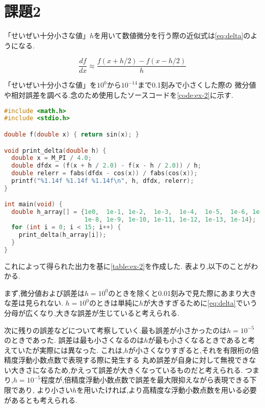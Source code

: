\documentclass[autodetect-engine, dvi=dvipdfmx, 10pt, a4paper, ja=standard]{bxjsarticle}
\begin{document}
\newpage

\section{課題2}

「せいぜい十分小さな値」$h$を用いて数値微分を行う際の近似式は\ref{eq:delta}のようになる.

\begin{equation}
	\label{eq:delta}
	\frac{df}{dx} \approx \frac{f(x + h / 2) - f(x - h / 2)}{h}
\end{equation}

「せいぜい十分小さな値」を$10^0$から$10^{-14}$まで0.1刻みで小さくした際の
微分値や相対誤差を調べる.念のため使用したソースコードを\ref{code:ex-2}に示す.

\begin{lstlisting}[language={C}, caption={課題2で使用したソースコード}, label={code:ex-2}]
#include <math.h>
#include <stdio.h>

double f(double x) { return sin(x); }

void print_delta(double h) {
  double x = M_PI / 4.0;
  double dfdx = (f(x + h / 2.0) - f(x - h / 2.0)) / h;
  double relerr = fabs(dfdx - cos(x)) / fabs(cos(x));
  printf("%1.14f %1.14f %1.14f\n", h, dfdx, relerr);
}

int main(void) {
  double h_array[] = {1e0,  1e-1, 1e-2,  1e-3,  1e-4,  1e-5,  1e-6, 1e-7,
                      1e-8, 1e-9, 1e-10, 1e-11, 1e-12, 1e-13, 1e-14};
  for (int i = 0; i < 15; i++) {
    print_delta(h_array[i]);
  }
}

\end{lstlisting}

これによって得られた出力を基に\ref{table:ex-2}を作成した.
表より,以下のことがわかる.

まず,微分値および誤差は$h=10^{0}$のときを除くと0.01刻みで見た際にあまり大きな差は見られない.
$h=10^{0}$のときは単純に$h$が大きすぎるために\ref{eq:delta}でいう分母が広くなり,大きな誤差が生じていると考えられる.

次に残りの誤差などについて考察していく.最も誤差が小さかったのは$h=10^{-5}$のときであった.
誤差は最も小さくなるのは$h$が最も小さくなるときであると考えていたが実際には異なった.
これは,$h$が小さくなりすぎると,それを有限桁の倍精度浮動小数点数で表現する際に発生する
丸め誤差が自身に対して無視できない大きさになるため,かえって誤差が大きくなっているものだと考えられる.
つまり,$h=10^{-5}$程度が,倍精度浮動小数点数で誤差を最大限抑えながら表現できる下限であり,
より小さい$h$を用いたければ,より高精度な浮動小数点数を用いる必要があるとも考えられる.
\end{document}

